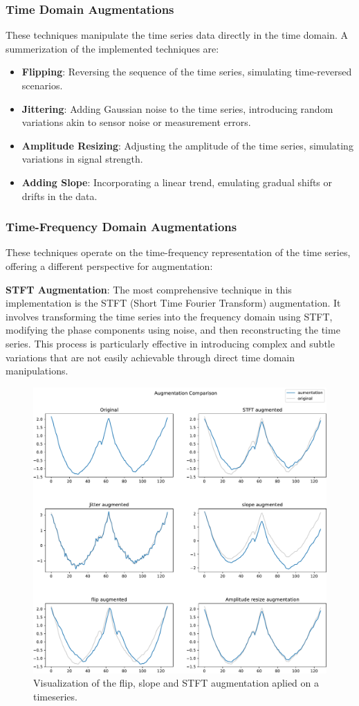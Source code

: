 \subsubsection*{Time Domain Augmentations}
These techniques manipulate the time series data directly in the time domain. A summerization of the implemented techniques are:
\begin{itemize}
    \item \textbf{Flipping}: Reversing the sequence of the time series, simulating time-reversed scenarios.
    \item \textbf{Jittering}: Adding Gaussian noise to the time series, introducing random variations akin to sensor noise or measurement errors.
    \item \textbf{Amplitude Resizing}: Adjusting the amplitude of the time series, simulating variations in signal strength.
    \item \textbf{Adding Slope}: Incorporating a linear trend, emulating gradual shifts or drifts in the data.
\end{itemize}

\subsubsection*{Time-Frequency Domain Augmentations}
These techniques operate on the time-frequency representation of the time series, offering a different perspective for augmentation:

\textbf{STFT Augmentation}: The most comprehensive technique in this implementation is the STFT (Short Time Fourier Transform) augmentation. It involves transforming the time series into the frequency domain using STFT, modifying the phase components using noise, and then reconstructing the time series. This process is particularly effective in introducing complex and subtle variations that are not easily achievable through direct time domain manipulations.

\begin{figure}
    \centering
    \includegraphics[width=\textwidth]{figures/figure-pdf/Augmentations.pdf}
    \caption{Visualization of the flip, slope and STFT augmentation aplied on a timeseries. }
\end{figure}
